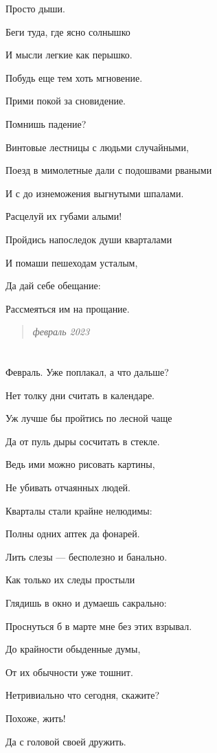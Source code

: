 \documentclass[
  a5paperpaper,
  DIV=11,
  numbers=noendperiod]{scrreprt}
\begin{document}
Просто дыши.

Беги туда, где ясно солнышко

И мысли легкие как перышко.

Побудь еще тем хоть мгновение.

Прими покой за сновидение.

Помнишь падение?

Винтовые лестницы с людьми случайными,

Поезд в мимолетные дали с подошвами рваными

И с до изнеможения выгнутыми шпалами.

Расцелуй их губами алыми!

Пройдись напоследок души кварталами

И помаши пешеходам усталым,

Да дай себе обещание:

Рассмеяться им на прощание.

\begin{quote}
\emph{февраль 2023}
\end{quote}

\section{}\label{section-17}

Февраль. Уже поплакал, а что дальше?

Нет толку дни считать в календаре.

Уж лучше бы пройтись по лесной чаще

Да от пуль дыры сосчитать в стекле.

Ведь ими можно рисовать картины,

Не убивать отчаянных людей.

Кварталы стали крайне нелюдимы:

Полны одних аптек да фонарей.

Лить слезы --- бесполезно и банально.

Как только их следы простыли

Глядишь в окно и думаешь сакрально:

Проснуться б в марте мне без этих взрывал.

До крайности обыденные думы,

От их обычности уже тошнит.

Нетривиально что сегодня, скажите?

Похоже, жить!

Да с головой своей дружить.
\end{document}
